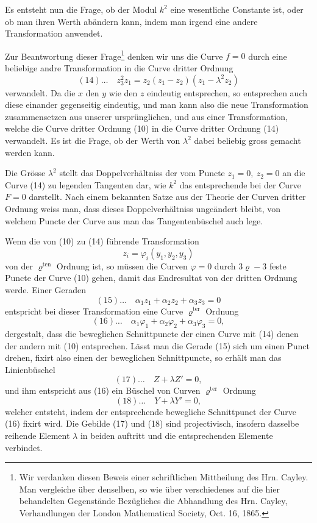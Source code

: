 \documentclass[10pt]{article}
\begin{document}
Es entsteht nun die Frage, ob der Modul \(k^2\) eine wesentliche Constante ist, oder ob man ihren Werth abändern kann, indem man irgend eine andere Transformation anwendet.

Zur Beantwortung dieser Frage\footnote{Wir verdanken diesen Beweis einer schriftlichen Mittheilung des Hrn. Cayley. Man vergleiche über denselben, so wie über verschiedenes auf die hier behandelten Gegenstände Bezügliches die Abhandlung des Hrn. Cayley, Verhandlungen der London Mathematical Society, Oct. 16, 1865.} denken wir uns die Curve \(f=0\) durch eine beliebige andre Transformation in die Curve dritter Ordnung
\[
(14)\ldots\quad z_3^2z_1=z_2(z_1-z_2)(z_1-\lambda^2z_2)
\]
verwandelt. Da die \(x\) den \(y\) wie den \(z\) eindeutig entsprechen, so entsprechen auch diese einander gegenseitig eindeutig, und man kann also die neue Transformation zusammensetzen aus unserer ursprünglichen, und aus einer Transformation, welche die Curve dritter Ordnung (10) in die Curve dritter Ordnung (14) verwandelt. Es ist die Frage, ob der Werth von \(\lambda^2\) dabei beliebig gross gemacht werden kann.

Die Grösse \(\lambda^2\) stellt das Doppelverhältniss der vom Puncte \(z_1=0,\ z_2=0\) an die Curve (14) zu legenden Tangenten dar, wie \(k^2\) das entsprechende bei der Curve \(F=0\) darstellt. Nach einem bekannten Satze aus der Theorie der Curven dritter Ordnung weiss man, dass dieses Doppelverhältniss ungeändert bleibt, von welchem Puncte der Curve aus man das Tangentenbüschel auch lege.

Wenn die von (10) zu (14) führende Transformation
\[
z_i=\varphi_i(y_1,y_2,y_3)
\]
von der \(\varrho^{\text{ten}}\) Ordnung ist, so müssen die Curven \(\varphi=0\) durch \(3\varrho-3\) feste Puncte der Curve (10) gehen, damit das Endresultat von der dritten Ordnung werde. Einer Geraden
\[
(15)\ldots\quad \alpha_1z_1+\alpha_2z_2+\alpha_3z_3=0
\]
entspricht bei dieser Transformation eine Curve \(\varrho^{\text{ter}}\) Ordnung
\[
(16)\ldots\quad \alpha_1\varphi_1+\alpha_2\varphi_2+\alpha_3\varphi_3=0,
\]
dergestalt, dass die beweglichen Schnittpuncte der einen Curve mit (14) denen der andern mit (10) entsprechen. Lässt man die Gerade (15) sich um einen Punct drehen, fixirt also einen der beweglichen Schnittpuncte, so erhält man das Linienbüschel
\[
(17)\ldots\quad Z+\lambda Z'=0,
\]
und ihm entspricht aus (16) ein Büschel von Curven \(\varrho^{\text{ter}}\) Ordnung
\[
(18)\ldots\quad Y+\lambda Y'=0,
\]
welcher entsteht, indem der entsprechende bewegliche Schnittpunct der Curve (16) fixirt wird. Die Gebilde (17) und (18) sind projectivisch, insofern dasselbe reihende Element \(\lambda\) in beiden auftritt und die entsprechenden Elemente verbindet.
\end{document}
